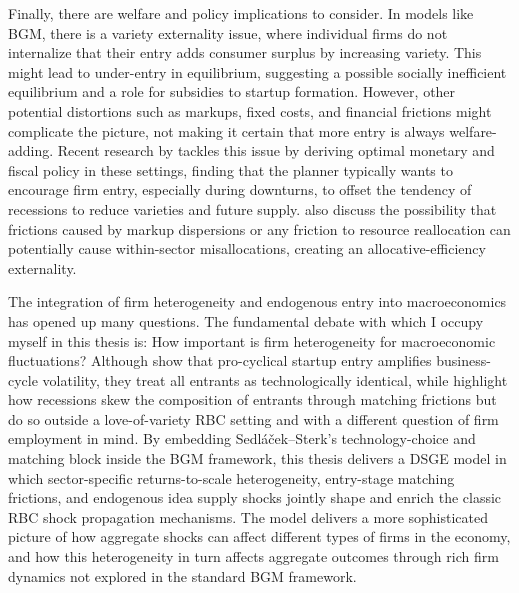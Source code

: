 \documentclass[a4paper,12pt]{article} %
\numberwithin{equation}{section} %
\numberwithin{figure}{section}
\numberwithin{table}{section}
\begin{document}
Finally, there are welfare and policy implications to consider. In models like BGM, there is a variety externality issue, where individual firms do not internalize
that their entry adds consumer surplus by increasing variety. This might lead to under-entry in equilibrium, suggesting a possible socially inefficient equilibrium 
and a role for subsidies to startup formation. However, other potential distortions such as markups, fixed costs, and financial frictions might complicate the picture, 
not making it certain that more entry is always welfare-adding. Recent research by \textcite{bilbiie2019monopoly} tackles this issue by deriving optimal monetary
and fiscal policy in these settings, finding that the planner typically wants to encourage firm entry, especially during downturns, to offset the tendency of recessions
to reduce varieties and future supply. \textcite{baqaee2020productivity} also discuss the possibility that frictions caused by
markup dispersions or any friction to resource reallocation can potentially cause within-sector misallocations, creating an allocative-efficiency externality.

The integration of firm heterogeneity and endogenous entry into macroeconomics has opened up many questions. The fundamental debate with which I occupy myself
in this thesis is: How important is firm heterogeneity for macroeconomic fluctuations? Although \textcite{bilbiie2012endogenous} show that 
pro-cyclical startup entry amplifies business-cycle volatility, they treat all entrants as technologically identical, while \textcite{sedlavcek2017growth} 
highlight how recessions skew the composition of entrants through matching frictions but do so outside a love-of-variety RBC setting and with a different question of
firm employment in mind. By embedding Sedláček–Sterk’s technology-choice and matching block inside the BGM framework, 
this thesis delivers a DSGE model in which sector-specific returns-to-scale heterogeneity, entry-stage matching frictions, and endogenous idea supply shocks jointly shape 
and enrich the classic RBC shock propagation mechanisms. The model delivers a more sophisticated picture of how aggregate shocks can affect different types of firms in the economy, and
how this heterogeneity in turn affects aggregate outcomes through rich firm dynamics not explored in the standard BGM framework.


\end{document}
